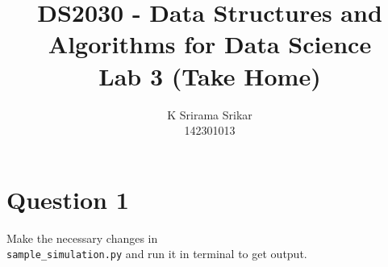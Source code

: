 \documentclass{article}
\title{\textbf{DS2030 - Data Structures and Algorithms for Data Science \\Lab 3 (Take Home)}}
\author{K Srirama Srikar \\142301013 }
\date{}
\begin{document}
\maketitle
\section{Question 1}
Make the necessary changes in \\ \texttt{sample_simulation.py} and run it in terminal to get output.
\end{document}
